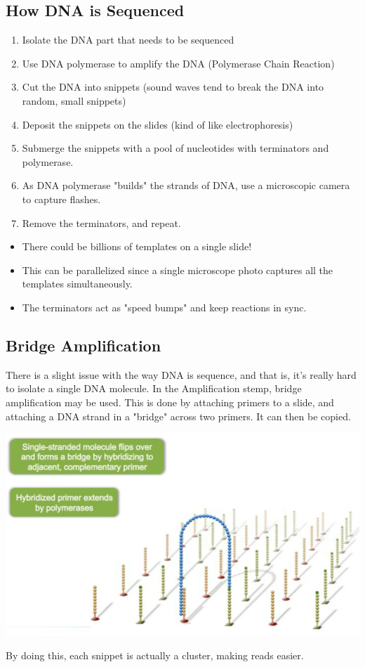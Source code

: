 \documentclass[10pt]{article}
\begin{document}
\subsection*{How DNA is Sequenced}
\begin{enumerate}
    \item Isolate the DNA part that needs to be sequenced
    \item Use DNA polymerase to amplify the DNA (Polymerase Chain Reaction)
    \item Cut the DNA into snippets (sound waves tend to break the DNA into random, small snippets)
    \item Deposit the snippets on the slides (kind of like electrophoresis)
    \item Submerge the snippets with a pool of nucleotides with terminators and polymerase.
    \item As DNA polymerase "builds" the strands of DNA, use a microscopic camera to capture flashes.
    \item Remove the terminators, and repeat.
\end{enumerate}
\begin{itemize}
    \item There could be billions of templates on a single slide!  
    \item This can be parallelized since a single microscope photo captures all the templates simultaneously.
    \item The terminators act as "speed bumps" and keep reactions in sync.
\end{itemize}

\subsection*{Bridge Amplification}
There is a slight issue with the way DNA is sequence, and that is, it's really hard to isolate a single DNA molecule.  In the Amplification stemp, bridge amplification may be used.
This is done by attaching primers to a slide, and attaching a DNA strand in a "bridge" across two primers.  It can then be copied.
\begin{center}
    \includegraphics*[scale=1]{W1_1.png}
\end{center}
By doing this, each snippet is actually a cluster, making reads easier.
\end{document}
